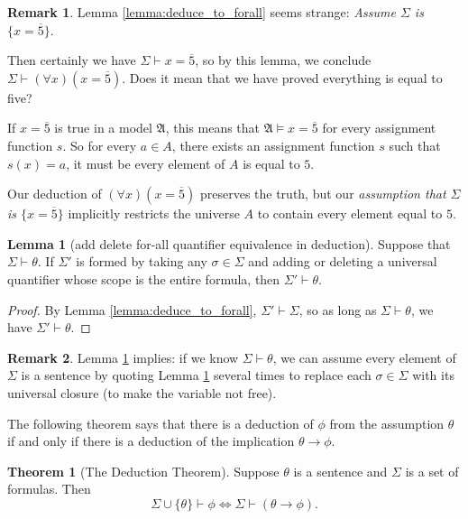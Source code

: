 \documentclass[11pt,letterpaper]{book}
\theoremstyle{definition}
\newtheorem{theorem}{Theorem}[section]
\newtheorem{lemma}{Lemma}[section]
\newtheorem{remark}{Remark}[section]
\begin{document}
\begin{remark}
Lemma \ref{lemma:deduce_to_forall} seems strange: \emph{Assume $\Sigma $
is $ \{ x = \overline{5} \}$}.

Then certainly we have $\Sigma \vdash x = \overline{5}$, so by this
lemma, we conclude $\Sigma \vdash (\forall x ) (x = \overline{5})$. Does
it mean that we have proved everything is equal to five?

If $x = \overline{5}$ is true in a model $\mathfrak{A}$, this means that
$\mathfrak{A} \models x = \overline{5}$ for every assignment function
$s$. So for every $a \in A$, there exists an assignment function $s$
such that $s(x)= a$, it must be every element of $A$ is equal to $5$.

Our deduction of $(\forall x ) (x = \overline{5})$ preserves the truth,
but our \emph{assumption that $\Sigma $ is $ \{ x = \overline{5} \}$} 
implicitly restricts the universe $A$ to contain every element equal to $5$.
\end{remark}


\begin{lemma}[add delete for-all quantifier equivalence in
deduction]\label{lemma:add_delete_forall}
Suppose that $\Sigma \vdash \theta$. If $\Sigma'$ is formed by taking
any $\sigma \in \Sigma$ and adding or deleting a universal quantifier
whose scope is the entire formula, then $\Sigma' \vdash \theta$.
\end{lemma}

\begin{proof}
By Lemma \ref{lemma:deduce_to_forall}, $\Sigma' \vdash \Sigma$, so as
long as $\Sigma \vdash \theta$, we have $\Sigma' \vdash \theta$.
\end{proof}

\begin{remark}\label{remark:add_delete_forall}
Lemma \ref{lemma:add_delete_forall} implies: if we know $\Sigma \vdash
\theta$, we can assume every element of $\Sigma$ is a sentence by
quoting Lemma \ref{lemma:add_delete_forall} several times to replace
each $\sigma \in \Sigma$ with its universal closure (to make the
variable not free).
\end{remark}



The following theorem says that there is a deduction of $\phi$ from the
assumption $\theta$ if and only if there is a deduction of the
implication $\theta \rightarrow \phi$.


\begin{theorem}[The Deduction Theorem]\label{theorem:deduction_theorem}
Suppose $\theta$ is a sentence and $\Sigma$ is a set of formulas. Then
$$\Sigma \cup \{ \theta \} \vdash \phi \iff \Sigma \vdash (\theta
\rightarrow \phi). $$
\end{theorem}
\end{document}
